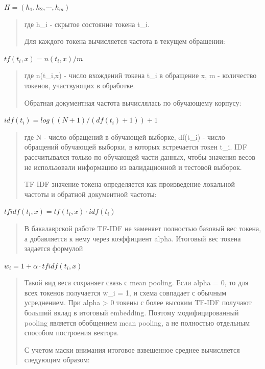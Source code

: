 \(H = \left( h_{1},h_{2},\cdots,h_{m} \right)\)

\begin{quote}
где h\_i - скрытое состояние токена t\_i.

Для каждого токена вычисляется частота в текущем обращении:
\end{quote}

\(tf\left( t_{i},x \right) = n\left( t_{i},x \right)/m\)

\begin{quote}
где n(t\_i,x) - число вхождений токена t\_i в обращение x, m -
количество токенов, участвующих в обработке.

Обратная документная частота вычислялась по обучающему корпусу:
\end{quote}

\(idf\left( t_{i} \right) = log\left( (N + 1)/\left( df\left( t_{i} \right) + 1 \right) \right) + 1\)

\begin{quote}
где N - число обращений в обучающей выборке, df(t\_i) - число обращений
обучающей выборки, в которых встречается токен t\_i. IDF рассчитывался
только по обучающей части данных, чтобы значения весов не использовали
информацию из валидационной и тестовой выборок.

TF-IDF значение токена определяется как произведение локальной частоты и
обратной документной частоты:
\end{quote}

\(tfidf\left( t_{i},x \right) = tf\left( t_{i},x \right) \cdot idf\left( t_{i} \right)\)

\begin{quote}
В бакалаврской работе TF-IDF не заменяет полностью базовый вес токена, а
добавляется к нему через коэффициент alpha. Итоговый вес токена задается
формулой
\end{quote}

\(w_{i} = 1 + \alpha \cdot tfidf\left( t_{i},x \right)\)

\begin{quote}
Такой вид веса сохраняет связь с mean pooling. Если alpha = 0, то для
всех токенов получается w\_i = 1, и схема совпадает с обычным
усреднением. При alpha \textgreater{} 0 токены с более высоким TF-IDF
получают больший вклад в итоговый embedding. Поэтому модифицированный
pooling является обобщением mean pooling, а не полностью отдельным
способом построения вектора.

С учетом маски внимания итоговое взвешенное среднее вычисляется
следующим образом:
\end{quote}

